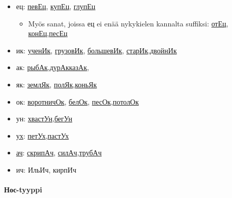\documentclass[]{scrartcl}
\providecommand{\tightlist}{%
  \setlength{\itemsep}{0pt}\setlength{\parskip}{0pt}}
\begin{document}
\begin{itemize}
\tightlist
\item
  ец: \href{http://ru.wiktionary.org/wiki/певец}{певЕц},
  \href{http://ru.wiktionary.org/wiki/купец}{купЕц},
  \href{http://ru.wiktionary.org/wiki/глупец}{глупЕц}

  \begin{itemize}
  \tightlist
  \item
    Myös sanat, joissa ец ei enää nykykielen kannalta suffiksi:
    \href{http://ru.wiktionary.org/wiki/отец}{отЕц},
    \href{http://ru.wiktionary.org/wiki/конец}{конЕц},\href{http://ru.wiktionary.org/wiki/песец}{песЕц}
  \end{itemize}
\item
  ик: \href{http://ru.wiktionary.org/wiki/ученик}{ученИк},
  \href{http://ru.wiktionary.org/wiki/грузовик}{грузовИк},
  \href{http://ru.wiktionary.org/wiki/большевик}{большевИк},
  \href{http://ru.wiktionary.org/wiki/старик}{старИк},\href{http://ru.wiktionary.org/wiki/двойник}{двойнИк}
\item
  ак:
  \href{http://ru.wiktionary.org/wiki/рыбак}{рыбАк},\href{http://ru.wiktionary.org/wiki/дурак}{дурАк}\href{http://ru.wiktionary.org/wiki/казак}{казАк},
\item
  як: \href{http://ru.wiktionary.org/wiki/земляк}{землЯк},
  \href{http://ru.wiktionary.org/wiki/поляк}{полЯк},\href{http://ru.wiktionary.org/wiki/коньяк}{коньЯк}
\item
  ок: \href{http://ru.wiktionary.org/wiki/воротничок}{воротничОк},
  \href{http://ru.wiktionary.org/wiki/белок}{белОк},
  \href{http://ru.wiktionary.org/wiki/песок}{песОк},\href{http://ru.wiktionary.org/wiki/потолок}{потолОк}
\item
  ун:
  \href{http://ru.wiktionary.org/wiki/хвастун}{хвастУн},\href{http://ru.wiktionary.org/wiki/бегун}{бегУн}
\item
  \href{http://ru.wiktionary.org/wiki/ух}{ух}:
  \href{http://ru.wiktionary.org/wiki/петух}{петУх},\href{http://ru.wiktionary.org/wiki/пастух}{пастУх}
\item
  \href{http://ru.wiktionary.org/wiki/ач}{ач}:
  \href{http://ru.wiktionary.org/wiki/скрипач}{скрипАч},
  \href{http://ru.wiktionary.org/wiki/силач}{силАч},\href{http://ru.wiktionary.org/wiki/трубач}{трубАч}
\item
  ич: ИльИч, кирпИч
\end{itemize}

\paragraph{Нос-tyyppi}\label{ux43dux43eux441-tyyppi}
\end{document}
